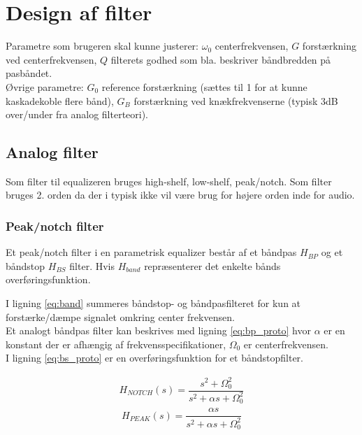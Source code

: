 \section{Design af filter}\label{sec:design_filter}


    Parametre som brugeren skal kunne justerer: $\omega_0$ centerfrekvensen, $G$ forstærkning ved centerfrekvensen, $Q$ filterets godhed som bla. beskriver
    båndbredden på pasbåndet.\\
    Øvrige parametre:
    $G_0$ reference forstærkning (sættes til 1 for at kunne kaskadekoble flere bånd), $G_B$ forstærkning ved knækfrekvenserne (typisk 3dB over/under fra analog filterteori).
    
    


    \subsection{Analog filter}

    Som filter til equalizeren bruges high-shelf, low-shelf, peak/notch.
    Som filter bruges 2. orden da der i typisk ikke vil være brug for højere orden
     inde for audio. 



     \subsubsection{Peak/notch filter}


     Et peak/notch filter i en parametrisk equalizer består af et båndpas $H_{BP}$ og et båndstop $H_{BS}$ filter. Hvis
    $H_{band}$ repræsenterer det enkelte bånds overføringsfunktion.

    I ligning \ref{eq:band} summeres båndstop- og båndpasfilteret for kun
    at forstærke/dæmpe signalet omkring center frekvensen.\\
    Et analogt båndpas filter kan beskrives med ligning \ref{eq:bp_proto} 
    hvor $\alpha$ er en konstant der er afhængig af frekvensspecifikationer, $\Omega_0$ er centerfrekvensen.\\
    I ligning \ref{eq:bs_proto} er en overføringsfunktion for et båndstopfilter.


     \begin{align}
     H_{NOTCH}(s) = \dfrac{s^2 + \Omega_0^2}{s^2 + \alpha s + \Omega_0^2}
     \label{eq:lp_proto}
    \end{align}
    \begin{align}
      H_{PEAK} (s) = \dfrac{\alpha s}{s^2 + \alpha s + \Omega_0^2}  
    \end{align}

